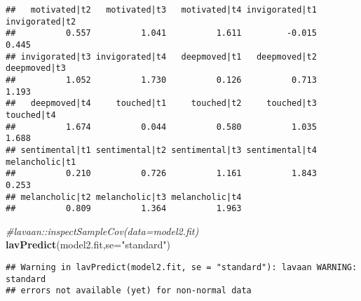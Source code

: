 \documentclass[
]{article}
\newenvironment{Shaded}{\begin{snugshade}}{\end{snugshade}}
\newcommand{\CommentTok}[1]{\textcolor[rgb]{0.56,0.35,0.01}{\textit{#1}}}
\newcommand{\DataTypeTok}[1]{\textcolor[rgb]{0.13,0.29,0.53}{#1}}
\newcommand{\KeywordTok}[1]{\textcolor[rgb]{0.13,0.29,0.53}{\textbf{#1}}}
\newcommand{\NormalTok}[1]{#1}
\newcommand{\StringTok}[1]{\textcolor[rgb]{0.31,0.60,0.02}{#1}}
\begin{document}
\begin{verbatim}
##   motivated|t2   motivated|t3   motivated|t4 invigorated|t1 invigorated|t2 
##          0.557          1.041          1.611         -0.015          0.445 
## invigorated|t3 invigorated|t4   deepmoved|t1   deepmoved|t2   deepmoved|t3 
##          1.052          1.730          0.126          0.713          1.193 
##   deepmoved|t4     touched|t1     touched|t2     touched|t3     touched|t4 
##          1.674          0.044          0.580          1.035          1.688 
## sentimental|t1 sentimental|t2 sentimental|t3 sentimental|t4 melancholic|t1 
##          0.210          0.726          1.161          1.843          0.253 
## melancholic|t2 melancholic|t3 melancholic|t4 
##          0.809          1.364          1.963
\end{verbatim}

\begin{Shaded}
\begin{Highlighting}[]
\CommentTok{\#lavaan::inspectSampleCov(data=model2.fit)}
\KeywordTok{lavPredict}\NormalTok{(model2.fit,}\DataTypeTok{se=}\StringTok{"standard"}\NormalTok{)}
\end{Highlighting}
\end{Shaded}

\begin{verbatim}
## Warning in lavPredict(model2.fit, se = "standard"): lavaan WARNING: standard
## errors not available (yet) for non-normal data
\end{verbatim}
\end{document}
